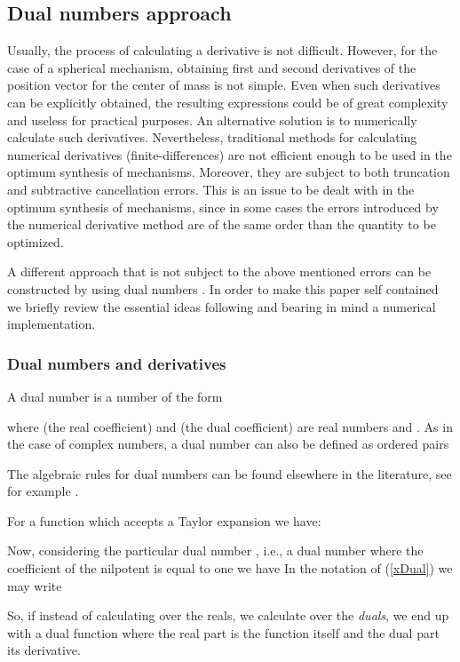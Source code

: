 \documentclass[11pt]{article}
\begin{document}
\subsection{Dual numbers approach}\label{subsec2.2}
Usually, the process of calculating a derivative is not difficult. 
However, for the case of a spherical mechanism, obtaining first and 
second derivatives of the position vector for the center of mass is not 
simple. Even when such derivatives can be explicitly obtained, the 
resulting expressions could be of great complexity and useless for 
practical purposes. An alternative solution is to numerically calculate 
such derivatives. Nevertheless, traditional methods for calculating 
numerical derivatives (finite-differences) are not efficient enough to 
be used in the optimum synthesis of mechanisms. Moreover, they are 
subject to both truncation and subtractive cancellation errors. This is 
an issue to be dealt with in the optimum synthesis of mechanisms, since 
in some cases the errors introduced by the numerical derivative method 
are of the same order than the quantity to be optimized.

A different approach that is not subject to the above mentioned errors 
can be constructed by using  dual numbers \cite{Gu1987,Cheng1994,
Penunuri2013}. In order to make this paper self contained we briefly 
review the essential ideas following \cite{Penunuri2013} and bearing in 
mind a numerical implementation. 

\subsubsection*{Dual numbers and derivatives}
A dual number  is a number of the form 

where  (the real coefficient) and  (the dual coefficient) are real 
numbers and . As in the case of complex numbers, a dual 
number can also be defined as ordered pairs

 
The algebraic rules for dual numbers can be found elsewhere in the 
literature, see for example  \cite{Clif1873, Brodsky1999,Ettore2008}.

For a function  which accepts a Taylor 
expansion we have:


Now, considering the particular dual number , i.e., 
a dual number where the coefficient of the nilpotent  is equal 
to one we have  In the 
notation of (\ref{xDual}) we may write
 
So, if instead of calculating over the reals, we calculate over the 
\textit{duals}, we end up with a dual function where the real part is 
the function itself and the dual part its derivative. 
\end{document}
